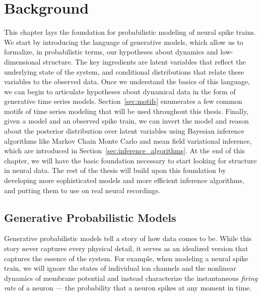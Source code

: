 
\chapter{Background}
This chapter lays the foundation for probabilistic modeling of neural
spike trains.  We start by introducing the language of generative
models, which allow us to formalize, in probabilistic terms, our
hypotheses about dynamics and low-dimensional structure.  The key
ingredients are latent variables that reflect the underlying state of
the system, and conditional distributions that relate these variables
to the observed data.  Once we understand the basics of this language,
we can begin to articulate hypotheses about dynamical data in the form
of generative time series models.  Section~\ref{sec:motifs} enumerates
a few common motifs of time series modeling that will be used
throughout this thesis.  Finally, given a model and an observed spike
train, we can invert the model and reason about the posterior
distribution over latent variables using Bayesian inference algorithms
like Markov Chain Monte Carlo and mean field variational inference,
which are introduced in Section~\ref{sec:inference_algorithms}.  At
the end of this chapter, we will have the basic foundation necessary
to start looking for structure in neural data. The rest of the thesis
will build upon this foundation by developing more sophisticated
models and more efficient inference algorithms, and putting them to
use on real neural recordings.

\section{Generative Probabilistic Models}
\label{sec:generative_models}
Generative probabilistic models tell a story of how data comes to be. 
While this story never captures every physical detail, it serves as an 
idealized version that captures the essence of the system. For example, when
modeling a neural spike train, we will ignore the states of individual ion 
channels and the nonlinear dynamics of membrane potential and instead 
characterize the instantaneous \emph{firing rate} of a neuron --- the 
probability that a neuron spikes at any moment in time. 

